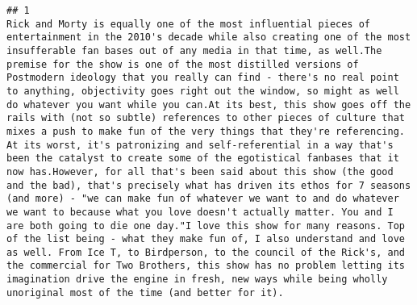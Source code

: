 \documentclass[
]{article}
\begin{document}
\begin{verbatim}
## 1                                                                                                                                                                                                                                                                                                                                                                                                                                                                                                                                                                                                                                                                                                                                                                                                                                                                                                                                                                         Rick and Morty is equally one of the most influential pieces of entertainment in the 2010's decade while also creating one of the most insufferable fan bases out of any media in that time, as well.The premise for the show is one of the most distilled versions of Postmodern ideology that you really can find - there's no real point to anything, objectivity goes right out the window, so might as well do whatever you want while you can.At its best, this show goes off the rails with (not so subtle) references to other pieces of culture that mixes a push to make fun of the very things that they're referencing. At its worst, it's patronizing and self-referential in a way that's been the catalyst to create some of the egotistical fanbases that it now has.However, for all that's been said about this show (the good and the bad), that's precisely what has driven its ethos for 7 seasons (and more) - "we can make fun of whatever we want to and do whatever we want to because what you love doesn't actually matter. You and I are both going to die one day."I love this show for many reasons. Top of the list being - what they make fun of, I also understand and love as well. From Ice T, to Birdperson, to the council of the Rick's, and the commercial for Two Brothers, this show has no problem letting its imagination drive the engine in fresh, new ways while being wholly unoriginal most of the time (and better for it).

\end{verbatim}
\end{document}
